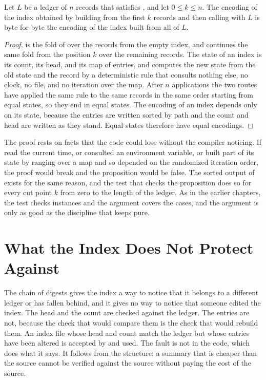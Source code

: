 \begin{proposition}\label{prop:rebuild}
Let $L$ be a ledger of $n$ records that satisfies , and let $0 \le k \le n$. The encoding of the index obtained by building from the first $k$ records and then calling  with $L$ is byte for byte the encoding of the index built from all of $L$.
\end{proposition}

\begin{proof}
 is the fold of  over the records from the empty index, and  continues the same fold from the position $k$ over the remaining records. The state of an index is its count, its head, and its map of entries, and  computes the new state from the old state and the record by a deterministic rule that consults nothing else, no clock, no file, and no iteration over the map. After $n$ applications the two routes have applied the same rule to the same records in the same order starting from equal states, so they end in equal states. The encoding of an index depends only on its state, because the entries are written sorted by path and the count and head are written as they stand. Equal states therefore have equal encodings.
\end{proof}

The proof rests on facts that the code could lose without the compiler noticing. If  read the current time, or consulted an environment variable, or built part of its state by ranging over a map and so depended on the randomized iteration order, the proof would break and the proposition would be false. The sorted output of  exists for the same reason, and the test that checks the proposition does so for every cut point $k$ from zero to the length of the ledger. As in the earlier chapters, the test checks instances and the argument covers the cases, and the argument is only as good as the discipline that keeps  pure.


\section{What the Index Does Not Protect Against}

The chain of digests gives the index a way to notice that it belongs to a different ledger or has fallen behind, and it gives no way to notice that someone edited the index. The head and the count are checked against the ledger. The entries are not, because the check that would compare them is the check that would rebuild them. An index file whose head and count match the ledger but whose entries have been altered is accepted by  and used. The fault is not in the code, which does what it says. It follows from the structure: a summary that is cheaper than the source cannot be verified against the source without paying the cost of the source.

